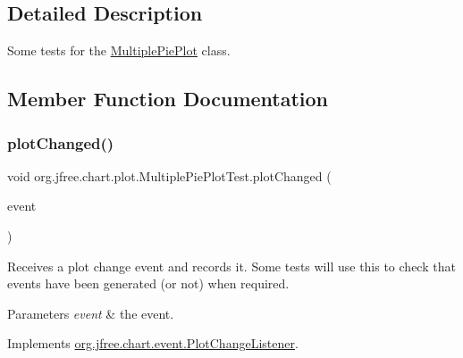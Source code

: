 \subsection{Detailed Description}
Some tests for the \mbox{\hyperlink{classorg_1_1jfree_1_1chart_1_1plot_1_1_multiple_pie_plot}{Multiple\+Pie\+Plot}} class. 

\subsection{Member Function Documentation}
\mbox{\label{classorg_1_1jfree_1_1chart_1_1plot_1_1_multiple_pie_plot_test_a88e02d041d529a4d0b14a91a2e2758e6}} 
\subsubsection{\texorpdfstring{plot\+Changed()}{plotChanged()}}
{\footnotesize\ttfamily void org.\+jfree.\+chart.\+plot.\+Multiple\+Pie\+Plot\+Test.\+plot\+Changed (\begin{DoxyParamCaption}\item[{\mbox{\hyperlink{classorg_1_1jfree_1_1chart_1_1event_1_1_plot_change_event}{Plot\+Change\+Event}}}]{event }\end{DoxyParamCaption})}

Receives a plot change event and records it. Some tests will use this to check that events have been generated (or not) when required.


\begin{DoxyParams}{Parameters}
{\em event} & the event. \\
\hline
\end{DoxyParams}


Implements \mbox{\hyperlink{interfaceorg_1_1jfree_1_1chart_1_1event_1_1_plot_change_listener_aff1bdd2cc91287021b58a2ae67aa159d}{org.\+jfree.\+chart.\+event.\+Plot\+Change\+Listener}}.

\mbox{\label{classorg_1_1jfree_1_1chart_1_1plot_1_1_multiple_pie_plot_test_a301d38dfae10c721cfb0acbfdacc10d5}} 
